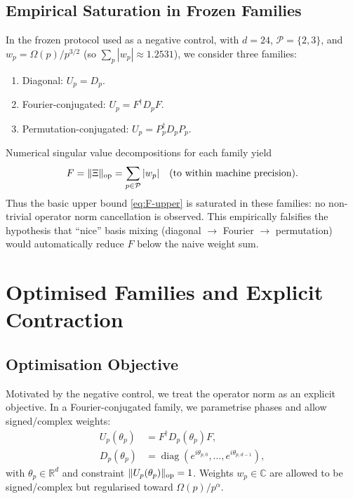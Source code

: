\documentclass[11pt,letterpaper]{article}
\begin{document}
\subsection{Empirical Saturation in Frozen Families}

In the frozen protocol used as a negative control, with
\(d=24\), \(\mathcal{P} = \{2,3\}\), and
\(w_p = \Omega(p)/p^{3/2}\) (so \(\sum_{p} |w_p| \approx 1.2531\)),
we consider three families:

\begin{enumerate}[leftmargin=*]
  \item Diagonal: \(U_p = D_p\).
  \item Fourier-conjugated: \(U_p = F^\dagger D_p F\).
  \item Permutation-conjugated: \(U_p = P_p^\dagger D_p P_p\).
\end{enumerate}

Numerical singular value decompositions for each family yield
\[
  F = \|\Xi\|_{\rm op} = \sum_{p\in\mathcal{P}} |w_p|
  \quad\text{(to within machine precision)}.
\]
Thus the basic upper bound \eqref{eq:F-upper} is saturated in these
families: no non-trivial operator norm cancellation is observed.
This empirically falsifies the hypothesis that ``nice'' basis mixing
(diagonal \(\to\) Fourier \(\to\) permutation) would automatically reduce
\(F\) below the naive weight sum.

\section{Optimised Families and Explicit Contraction}

\subsection{Optimisation Objective}

Motivated by the negative control, we treat the operator norm as an
explicit objective. In a Fourier-conjugated family, we parametrise
phases and allow signed/complex weights:
\begin{align}
  U_p(\theta_p) &= F^\dagger D_p(\theta_p) F, \\
  D_p(\theta_p) &= \operatorname{diag}(e^{i\theta_{p,0}},\dots,e^{i\theta_{p,d-1}}),
\end{align}
with \(\theta_p \in \mathbb{R}^d\) and constraint \(\|U_p(\theta_p)\|_{\rm op}=1\).
Weights \(w_p\in\mathbb{C}\) are allowed to be signed/complex but
regularised toward \(\Omega(p)/p^\alpha\).
\end{document}
